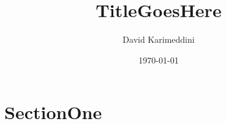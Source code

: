 \documentclass[12pt,twoside,letterpaper]{article}
\author{David Karimeddini}
\title{TitleGoesHere}
\date{\today}
\begin{document}
\maketitle
\tableofcontents

\section{SectionOne}
\end{document}
